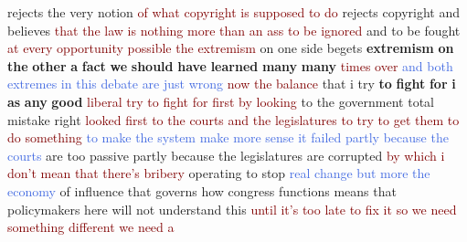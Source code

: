 rejects the very notion \textcolor{Maroon}{of} \textcolor{Maroon}{what} \textcolor{Maroon}{copyright} \textcolor{Maroon}{is} \textcolor{Maroon}{supposed} \textcolor{Maroon}{to} \textcolor{Maroon}{do} rejects copyright and believes \textcolor{Maroon}{that} \textcolor{Maroon}{the} \textcolor{Maroon}{law} \textcolor{Maroon}{is} \textcolor{Maroon}{nothing} \textcolor{Maroon}{more} \textcolor{Maroon}{than} \textcolor{Maroon}{an} \textcolor{Maroon}{ass} \textcolor{Maroon}{to} \textcolor{Maroon}{be} \textcolor{Maroon}{ignored} and to be fought \textcolor{Maroon}{at} \textcolor{Maroon}{every} \textcolor{Maroon}{opportunity} \textcolor{Maroon}{possible} \textcolor{Maroon}{the} \textcolor{Maroon}{extremism} on one side begets \textbf{extremism} \textbf{on} \textbf{the} \textbf{other} \textbf{a} \textbf{fact} \textbf{we} \textbf{should} \textbf{have} \textbf{learned} \textbf{many} \textbf{many} \textcolor{Maroon}{times} \textcolor{Maroon}{over} \textcolor{RoyalBlue}{and} \textcolor{RoyalBlue}{both} \textcolor{RoyalBlue}{extremes} \textcolor{RoyalBlue}{in} \textcolor{RoyalBlue}{this} \textcolor{RoyalBlue}{debate} \textcolor{RoyalBlue}{are} \textcolor{RoyalBlue}{just} \textcolor{RoyalBlue}{wrong} \textcolor{Maroon}{now} \textcolor{Maroon}{the} \textcolor{Maroon}{balance} that i try \textbf{to} \textbf{fight} \textbf{for} \textbf{i} \textbf{as} \textbf{any} \textbf{good} \textcolor{Maroon}{liberal} \textcolor{Maroon}{try} \textcolor{Maroon}{to} \textcolor{Maroon}{fight} \textcolor{Maroon}{for} \textcolor{Maroon}{first} \textcolor{Maroon}{by} \textcolor{Maroon}{looking} to the government total mistake right \textcolor{Maroon}{looked} \textcolor{Maroon}{first} \textcolor{Maroon}{to} \textcolor{Maroon}{the} \textcolor{Maroon}{courts} \textcolor{Maroon}{and} \textcolor{Maroon}{the} \textcolor{Maroon}{legislatures} \textcolor{Maroon}{to} \textcolor{Maroon}{try} \textcolor{Maroon}{to} \textcolor{Maroon}{get} \textcolor{Maroon}{them} \textcolor{Maroon}{to} \textcolor{Maroon}{do} \textcolor{Maroon}{something} \textcolor{RoyalBlue}{to} \textcolor{RoyalBlue}{make} \textcolor{RoyalBlue}{the} \textcolor{RoyalBlue}{system} \textcolor{RoyalBlue}{make} \textcolor{RoyalBlue}{more} \textcolor{RoyalBlue}{sense} \textcolor{RoyalBlue}{it} \textcolor{RoyalBlue}{failed} \textcolor{RoyalBlue}{partly} \textcolor{RoyalBlue}{because} \textcolor{RoyalBlue}{the} \textcolor{RoyalBlue}{courts} are too passive partly because the legislatures are corrupted \textcolor{Maroon}{by} \textcolor{Maroon}{which} \textcolor{Maroon}{i} \textcolor{Maroon}{don't} \textcolor{Maroon}{mean} \textcolor{Maroon}{that} \textcolor{Maroon}{there's} \textcolor{Maroon}{bribery} operating to stop \textcolor{RoyalBlue}{real} \textcolor{RoyalBlue}{change} \textcolor{RoyalBlue}{but} \textcolor{RoyalBlue}{more} \textcolor{RoyalBlue}{the} \textcolor{RoyalBlue}{economy} of influence that governs how congress functions means that policymakers here will not understand this \textcolor{Maroon}{until} \textcolor{Maroon}{it's} \textcolor{Maroon}{too} \textcolor{Maroon}{late} \textcolor{Maroon}{to} \textcolor{Maroon}{fix} \textcolor{Maroon}{it} \textcolor{Maroon}{so} \textcolor{Maroon}{we} \textcolor{Maroon}{need} \textcolor{Maroon}{something} \textcolor{Maroon}{different} \textcolor{Maroon}{we} \textcolor{Maroon}{need} \textcolor{Maroon}{a} 